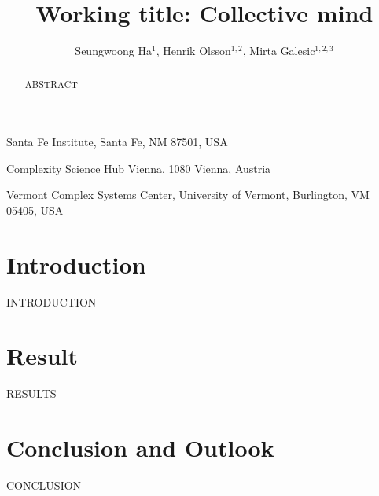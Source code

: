 \documentclass{nature}
\title{Working title: Collective mind}
\author{Seungwoong Ha$^{1}$, Henrik Olsson$^{1,2}$, Mirta Galesic$^{1,2,3}$}
\begin{document}
\maketitle

\begin{affiliations}
 \item Santa Fe Institute, Santa Fe, NM 87501, USA
 \item Complexity Science Hub Vienna, 1080 Vienna, Austria
 \item Vermont Complex Systems Center, University of Vermont, Burlington, VM 05405, USA
\end{affiliations}

\begin{abstract}

  ABSTRACT

\end{abstract}

\section{Introduction}

INTRODUCTION

\section{Result}

RESULTS

\section{Conclusion and Outlook}

CONCLUSION
\end{document}
